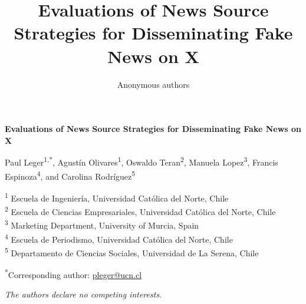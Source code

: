 \documentclass[11pt]{article}
\begin{document}
\title{Evaluations of News Source Strategies for Disseminating Fake News on X}
\begin{center}
{\LARGE\bfseries Evaluations of News Source Strategies for Disseminating Fake News on X\par}
\end{center}
\ifdefined\ANONYMOUS
  \author{Anonymous authors}
\else
\begin{center}
{\large
Paul Leger\textsuperscript{1,*}, Agust\'in Olivares\textsuperscript{1}, Oswaldo Teran\textsuperscript{2}, Manuela Lopez\textsuperscript{3}, Francis Espinoza\textsuperscript{4}, and Carolina Rodr\'iguez\textsuperscript{5}\par}
\vspace{0.8em}

\begin{small}
\textsuperscript{1} Escuela de Ingenier\'ia, Universidad Cat\'olica del Norte, Chile\\
\textsuperscript{2} Escuela de Ciencias Empresariales, Universidad Cat\'olica del Norte, Chile\\
\textsuperscript{3} Marketing Department, University of Murcia, Spain\\
\textsuperscript{4} Escuela de Periodismo, Universidad Cat\'olica del Norte, Chile\\
\textsuperscript{5} Departamento de Ciencias Sociales, Universidad de La Serena, Chile

\vspace{0.4em}

\textsuperscript{*}Corresponding author: \href{mailto:pleger@ucn.cl}{pleger@ucn.cl}
\end{small}

\vspace{0.8em}
\emph{The authors declare no competing interests.}
\end{center}

\fi
\date{}










\appendix

\clearpage

\providecommand{\doi}[1]{\url{https://doi.org/#1}}

\end{document}
